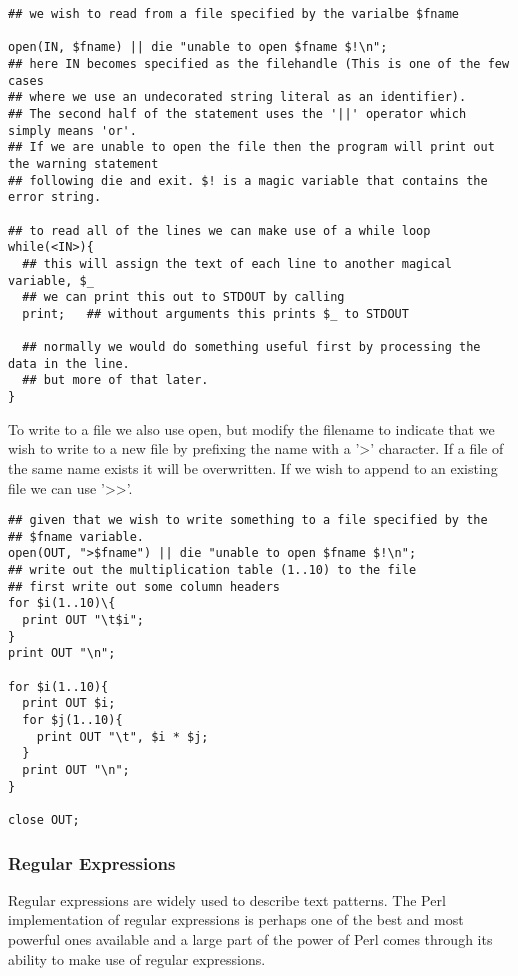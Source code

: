 \documentclass[11pt]{article}
\begin{document}
\begin{verbatim}
## we wish to read from a file specified by the varialbe $fname

open(IN, $fname) || die "unable to open $fname $!\n";
## here IN becomes specified as the filehandle (This is one of the few cases
## where we use an undecorated string literal as an identifier).
## The second half of the statement uses the '||' operator which simply means 'or'.
## If we are unable to open the file then the program will print out the warning statement
## following die and exit. $! is a magic variable that contains the error string.

## to read all of the lines we can make use of a while loop
while(<IN>){
  ## this will assign the text of each line to another magical variable, $_
  ## we can print this out to STDOUT by calling
  print;   ## without arguments this prints $_ to STDOUT

  ## normally we would do something useful first by processing the data in the line.
  ## but more of that later.
}
\end{verbatim}



To write to a file we also use open, but modify the filename to indicate
that we wish to write to a new file by prefixing the name with a '>'
character. If a file of the same name exists it will be overwritten. If
we wish to append to an existing file we can use '>>'.

\begin{verbatim}
## given that we wish to write something to a file specified by the
## $fname variable.
open(OUT, ">$fname") || die "unable to open $fname $!\n";
## write out the multiplication table (1..10) to the file
## first write out some column headers
for $i(1..10)\{
  print OUT "\t$i";
}
print OUT "\n";

for $i(1..10){
  print OUT $i;
  for $j(1..10){
    print OUT "\t", $i * $j;
  }
  print OUT "\n";
}

close OUT;
\end{verbatim}

\subsubsection{Regular Expressions}
\label{sec-5-0-6}

Regular expressions are widely used to describe text patterns. The Perl
implementation of regular expressions is perhaps one of the best and
most powerful ones available and a large part of the power of Perl comes
through its ability to make use of regular expressions.
\end{document}
